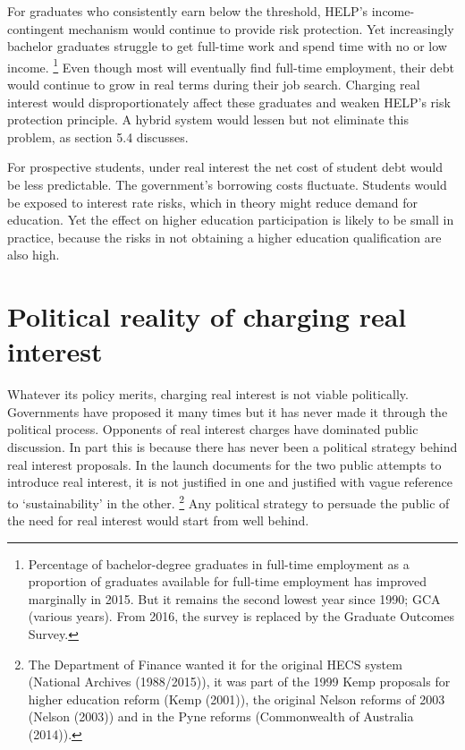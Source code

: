 \documentclass[embargoed]{grattan}
\begin{document}
For graduates who consistently earn below the threshold, HELP's income-contingent mechanism would continue to provide risk protection.
Yet increasingly bachelor graduates struggle to get full-time work and spend time with no or low income. \footnote{Percentage of bachelor-degree graduates in full-time employment as a proportion of graduates available for full-time employment has improved marginally in 2015.
But it remains the second lowest year since 1990; GCA (various years).
From 2016, the survey is replaced by the Graduate Outcomes Survey.} Even though most will eventually find full-time employment, their debt would continue to grow in real terms during their job search.
Charging real interest would disproportionately affect these graduates and weaken HELP's risk protection principle.
A hybrid system would lessen but not eliminate this problem, as section 5.4 discusses.

For prospective students, under real interest the net cost of student debt would be less predictable.
The government's borrowing costs fluctuate.
Students would be exposed to interest rate risks, which in theory might reduce demand for education.
Yet the effect on higher education participation is likely to be small in practice, because the risks in not obtaining a higher education qualification are also high.

\section{Political reality of charging real interest}\label{political-reality-of-charging-real-interest}

Whatever its policy merits, charging real interest is not viable politically.
Governments have proposed it many times but it has never made it through the political process.
Opponents of real interest charges have dominated public discussion.
In part this is because there has never been a political strategy behind real interest proposals.
In the launch documents for the two public attempts to introduce real interest, it is not justified in one and justified with vague reference to `sustainability' in the other.%
\footnote{The Department of Finance wanted it for the original HECS system (National Archives (1988/2015)), it was part of the 1999 Kemp proposals for higher education reform (Kemp (2001)), the original Nelson reforms of 2003 (Nelson (2003)) and in the Pyne reforms (Commonwealth of Australia (2014)).} Any political strategy to persuade the public of the need for real interest would start from well behind.
\end{document}
